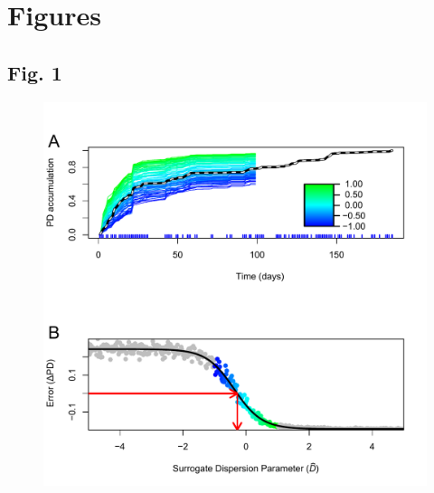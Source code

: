 \documentclass{article}
\begin{document}
\section{Figures}
{\parindent0pt %
\subsection{Fig. 1}\label{sec:figure1}
\begin{figure}[ht]
	\centering
	\includegraphics[scale=0.80]{figs/Fig_1.pdf}
\end{figure}
}
\end{document}
